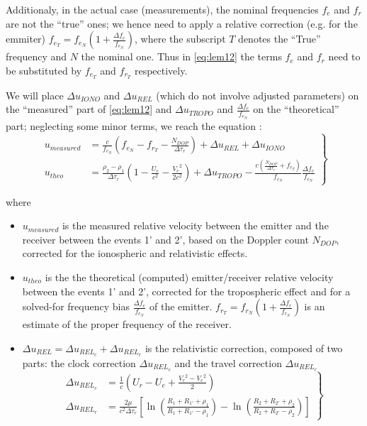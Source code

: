 Additionaly, in the actual case (measurements), the nominal frequencies \(f_e\) and \(f_r\) 
are not the ``true'' ones; we hence need to apply a relative correction (e.g. for the 
emmiter) \(f_{e_T} = f_{e_N} (1 + \frac{\Delta f_e}{f_{e_N}})\), where the subscript \(T\) 
denotes the ``True'' frequency and \(N\) the nominal one. Thus in \ref{eq:lem12} the 
terms \(f_e\) and \(f_r\) need to be substituted by \(f_{e_T}\) and \(f_{r_T}\) respectively.

We will place \(\Delta u_{IONO}\) and \(\Delta u_{REL}\) (which do not involve adjusted parameters) 
on the ``measured'' part of \ref{eq:lem12} and \(\Delta u_{TROPO}\) and \(\frac{\Delta f_e}{f_{e_N}}\) 
on the ``theoretical'' part; neglecting some minor terms, we reach the equation \cite{lemoine-2016}:
\begin{equation}
    \label{eq:lem13}
    \left.\begin{aligned}
        u_{measured} & = \frac{c}{f_{e_N}} (f_{e_N} - f_{r_T} -
         \frac{N_{DOP}}{\Delta\tau_r}) + \Delta u_{REL} + \Delta u_{IONO}\\
        u_{theo} &= \frac{\rho_2 - \rho_1}{\Delta\tau_r} (1- \frac{U_e}{c^2} - \frac{{V_e}^2}{2 c^2}) + \Delta u_{TROPO} - \frac{c(\frac{N_{DOP}}{\Delta\tau_r} + f_{r_T})}{f_{e_N}} \frac{\Delta f_e}{f_{e_N}}
    \end{aligned}
\right\}
\end{equation}

where 
\begin{itemize}
    \item \(u_{measured}\) is the measured relative velocity between the emitter and 
    the receiver between the events 1' and 2', based on the Doppler count \(N_{DOP}\), 
    corrected for the ionospheric and relativistic effects.

    \item \(u_{theo}\) is the the theoretical (computed) emitter/receiver relative velocity 
    between the events 1' and 2', corrected for the tropospheric effect and for a solved-for 
    frequency bias \(\frac{\Delta f_e}{f_{e_N}}\) of the emitter. \(f_{r_T} = f_{r_N} (1 + \frac{\Delta f_r}{f_{r_N}})\) 
    is an estimate of the proper frequency of the receiver.

    \item \(\Delta u_{REL} = \Delta u_{{REL}_c} + \Delta u_{{REL}_r}\) is the relativistic 
    correction, composed of two parts: the clock correction \(\Delta u_{{REL}_c}\) and the 
    travel correction \(\Delta u_{{REL}_r}\)
    \begin{equation}
        \left.\begin{aligned}
            \Delta u_{{REL}_c} & = \frac{1}{c} (U_r - U_e + \frac{{V_r}^2 - {V_e}^2}{2})\\
            \Delta u_{{REL}_r} & = \frac{2 \mu}{c^2 \Delta\tau_r} [\ln{(\frac{R_1 + R_{1'} + \rho_1}{R_1 + R_{1'} - \rho_1})} - \ln{(\frac{R_2 + R_{2'} + \rho_2}{R_2 + R_{2'} - \rho_2})}]
        \end{aligned}
    \right\}
    \end{equation}
\end{itemize}


